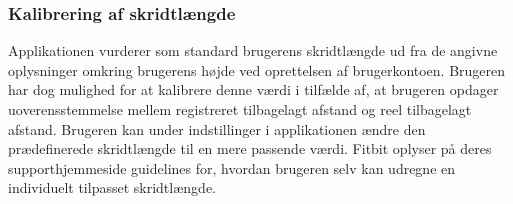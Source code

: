 
\subsubsection{Kalibrering af skridtlængde}
Applikationen vurderer som standard brugerens skridtlængde ud fra de angivne oplysninger omkring brugerens højde ved oprettelsen af brugerkontoen. Brugeren har dog mulighed for at kalibrere denne værdi i tilfælde af, at brugeren opdager uoverensstemmelse mellem registreret tilbagelagt afstand og reel tilbagelagt afstand. Brugeren kan under indstillinger i applikationen ændre den prædefinerede skridtlængde til en mere passende værdi. Fitbit oplyser på deres supporthjemmeside guidelines for, hvordan brugeren selv kan udregne en individuelt tilpasset skridtlængde.   

